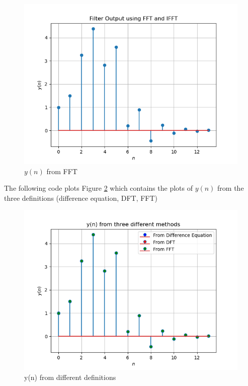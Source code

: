 \documentclass[journal,12pt,twocolumn]{IEEEtran}
\renewcommand\thesection{\arabic{section}}
\begin{document}
\begin{enumerate}[label=\thesection.\arabic*]
\begin{figure}[!ht]
\includegraphics[width=\columnwidth]{figures/Figure_7.png}
\caption{$y(n)$ from FFT}
\label{fig:ynfft}
\end{figure}
The following code plots Figure \ref{fig:ynall} which contains the plots of $y(n)$ from the three definitions (difference equation, DFT, FFT)
\begin{figure}[h!]
    \centering
    \includegraphics[width=\columnwidth]{figures/Figure_all.png}
    \caption{y(n) from different definitions}
    \label{fig:ynall}
\end{figure}
\end{enumerate}
%
\end{document}
